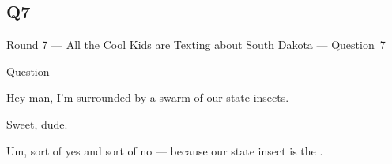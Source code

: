 \documentclass[11pt]{beamer}
\begin{document}
\subsection*{Q7}
\begin{frame}[t]{Round 7 --- All the Cool Kids are Texting about South Dakota --- \mbox{Question 7}}
\begin{block}{Question}

\begin{minipage}{0.9\textwidth}
\begin{mdframed}[
    roundcorner=7pt,
    backgroundcolor=black!5,
    linecolor=black!5,
    fontcolor=black,
    ignorelastdescenders]
\begin{flushleft}
{\small{}\selectfont{}
Hey man, I'm surrounded by a swarm of our state insects.
}
\end{flushleft}
\end{mdframed}
\end{minipage}

\hfill{}\begin{minipage}{0.9\textwidth}
\begin{mdframed}[
    roundcorner=7pt,
    backgroundcolor=blue!80!white,
    linecolor=blue!80!white,
    fontcolor=white,
    ignorelastdescenders]
\begin{flushleft}
{\small{}\selectfont{}
Sweet, dude.
}
\end{flushleft}
\end{mdframed}
\end{minipage}

\begin{minipage}{0.9\textwidth}
\begin{mdframed}[
    roundcorner=7pt,
    backgroundcolor=black!5,
    linecolor=black!5,
    fontcolor=black,
    ignorelastdescenders]
\begin{flushleft}
{\small{}\selectfont{}
Um, sort of yes and sort of no --- because our state insect is the \textunderscore{}\textunderscore{}\textunderscore{}\textunderscore{}\textunderscore{}\textunderscore{} \textunderscore{}\textunderscore{}\textunderscore{}\textunderscore{}\textunderscore{}\textunderscore{}.
}
\end{flushleft}
\end{mdframed}
\end{minipage}
\end{block}
\end{frame}
\end{document}
